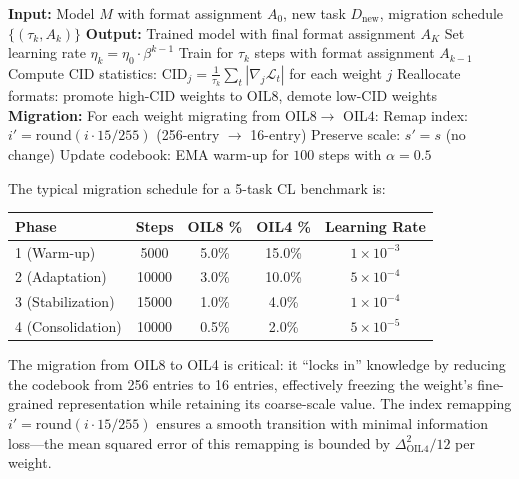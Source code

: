 \begin{algorithm}[H]
\caption{OIL Format Migration During Continual Learning}
\label{alg:format_migration}
\begin{algorithmic}[1]
\STATE \textbf{Input:} Model $M$ with format assignment $A_0$, new task $D_{\text{new}}$, migration schedule $\{(\tau_k, A_k)\}$
\STATE \textbf{Output:} Trained model with final format assignment $A_K$
    \STATE Set learning rate $\eta_k = \eta_0 \cdot \beta^{k-1}$
    \STATE Train for $\tau_k$ steps with format assignment $A_{k-1}$
    \STATE Compute CID statistics: $\text{CID}_j = \frac{1}{\tau_k} \sum_{t} |\nabla_j \mathcal{L}_t|$ for each weight $j$
    \STATE Reallocate formats: promote high-CID weights to OIL8, demote low-CID weights
    \STATE \textbf{Migration:} For each weight migrating from OIL$8 \to$ OIL$4$:
    \STATE \quad Remap index: $i' = \text{round}(i \cdot 15 / 255)$ (256-entry $\to$ 16-entry)
    \STATE \quad Preserve scale: $s' = s$ (no change)
    \STATE \quad Update codebook: EMA warm-up for $100$ steps with $\alpha = 0.5$
\ENDFOR
\end{algorithmic}
\end{algorithm}

The typical migration schedule for a 5-task CL benchmark is:

\begin{center}
\begin{tabular}{lcccc}
\toprule
\textbf{Phase} & \textbf{Steps} & \textbf{OIL8 \%} & \textbf{OIL4 \%} & \textbf{Learning Rate} \\
\midrule
1 (Warm-up) & 5000 & 5.0\% & 15.0\% & $1 \times 10^{-3}$ \\
2 (Adaptation) & 10000 & 3.0\% & 10.0\% & $5 \times 10^{-4}$ \\
3 (Stabilization) & 15000 & 1.0\% & 4.0\% & $1 \times 10^{-4}$ \\
4 (Consolidation) & 10000 & 0.5\% & 2.0\% & $5 \times 10^{-5}$ \\
\bottomrule
\end{tabular}
\end{center}

The migration from OIL8 to OIL4 is critical: it ``locks in'' knowledge by reducing the codebook from 256 entries to 16 entries, effectively freezing the weight's fine-grained representation while retaining its coarse-scale value. The index remapping $i' = \text{round}(i \cdot 15 / 255)$ ensures a smooth transition with minimal information loss---the mean squared error of this remapping is bounded by $\Delta_{\text{OIL4}}^2 / 12$ per weight.

